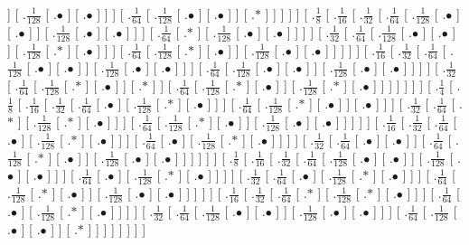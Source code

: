 \documentclass[a4paper,10pt]{article}
\begin{document}
\begin{landscape}
{]  [ .$\frac{1}{128}$  [ .$\bullet$ ]  [ .$\bullet$ ]  ]  ]  [ .$\frac{1}{64}$  [ .$\frac{1}{128}$  [ .$\bullet$ ]  [ .$\bullet$ ]  ]  [ .$*$ ]  ]  ]  ]  ]  [ .$\frac{1}{8}$  [ .$\frac{1}{16}$  [ .$\frac{1}{32}$  [ .$\frac{1}{64}$  [ .$\frac{1}{128}$  [ .$\bullet$ ]  [ .$\bullet$ ]  ]  [ .$\frac{1}{128}$  [ .$\bullet$ ]  [ .$\bullet$ ]  ]  ]  [ .$\frac{1}{64}$  [ .$*$ ]  [ .$\frac{1}{128}$  [ .$\bullet$ ]  [ .$\bullet$ ]  ]  ]  ]  [ .$\frac{1}{32}$  [ .$\frac{1}{64}$  [ .$\frac{1}{128}$  [ .$\bullet$ ]  [ .$\bullet$ ]  ]  [ .$\frac{1}{128}$  [ .$*$ ]  [ .$\bullet$ ]  ]  ]  [ .$\frac{1}{64}$  [ .$\frac{1}{128}$  [ .$*$ ]  [ .$\bullet$ ]  ]  [ .$\frac{1}{128}$  [ .$\bullet$ ]  [ .$\bullet$ ]  ]  ]  ]  ]  [ .$\frac{1}{16}$  [ .$\frac{1}{32}$  [ .$\frac{1}{64}$  [ .$\frac{1}{128}$  [ .$\bullet$ ]  [ .$\bullet$ ]  ]  [ .$\frac{1}{128}$  [ .$\bullet$ ]  [ .$\bullet$ ]  ]  ]  [ .$\frac{1}{64}$  [ .$\frac{1}{128}$  [ .$\bullet$ ]  [ .$\bullet$ ]  ]  [ .$\frac{1}{128}$  [ .$\bullet$ ]  [ .$\bullet$ ]  ]  ]  ]  [ .$\frac{1}{32}$  [ .$\frac{1}{64}$  [ .$\frac{1}{128}$  [ .$*$ ]  [ .$\bullet$ ]  ]  [ .$*$ ]  ]  [ .$\frac{1}{64}$  [ .$\frac{1}{128}$  [ .$*$ ]  [ .$\bullet$ ]  ]  [ .$\frac{1}{128}$  [ .$*$ ]  [ .$\bullet$ ]  ]  ]  ]  ]  ]  ]  [ .$\frac{1}{4}$  [ .$\frac{1}{8}$  [ .$\frac{1}{16}$  [ .$\frac{1}{32}$  [ .$\frac{1}{64}$  [ .$\bullet$ ]  [ .$\frac{1}{128}$  [ .$*$ ]  [ .$\bullet$ ]  ]  ]  [ .$\frac{1}{64}$  [ .$\frac{1}{128}$  [ .$*$ ]  [ .$\bullet$ ]  ]  [ .$\bullet$ ]  ]  ]  [ .$\frac{1}{32}$  [ .$\frac{1}{64}$  [ .$*$ ]  [ .$\frac{1}{128}$  [ .$*$ ]  [ .$\bullet$ ]  ]  ]  [ .$\frac{1}{64}$  [ .$\frac{1}{128}$  [ .$*$ ]  [ .$\bullet$ ]  ]  [ .$\frac{1}{128}$  [ .$\bullet$ ]  [ .$\bullet$ ]  ]  ]  ]  ]  [ .$\frac{1}{16}$  [ .$\frac{1}{32}$  [ .$\frac{1}{64}$  [ .$\bullet$ ]  [ .$\frac{1}{128}$  [ .$*$ ]  [ .$\bullet$ ]  ]  ]  [ .$\frac{1}{64}$  [ .$\bullet$ ]  [ .$\frac{1}{128}$  [ .$*$ ]  [ .$\bullet$ ]  ]  ]  ]  [ .$\frac{1}{32}$  [ .$\frac{1}{64}$  [ .$\bullet$ ]  [ .$\bullet$ ]  ]  [ .$\frac{1}{64}$  [ .$\frac{1}{128}$  [ .$*$ ]  [ .$\bullet$ ]  ]  [ .$\frac{1}{128}$  [ .$\bullet$ ]  [ .$\bullet$ ]  ]  ]  ]  ]  ]  [ .$\frac{1}{8}$  [ .$\frac{1}{16}$  [ .$\frac{1}{32}$  [ .$\frac{1}{64}$  [ .$\frac{1}{128}$  [ .$\bullet$ ]  [ .$\bullet$ ]  ]  [ .$\frac{1}{128}$  [ .$\bullet$ ]  [ .$\bullet$ ]  ]  ]  [ .$\frac{1}{64}$  [ .$\bullet$ ]  [ .$\frac{1}{128}$  [ .$*$ ]  [ .$\bullet$ ]  ]  ]  ]  [ .$\frac{1}{32}$  [ .$\frac{1}{64}$  [ .$\bullet$ ]  [ .$\frac{1}{128}$  [ .$*$ ]  [ .$\bullet$ ]  ]  ]  [ .$\frac{1}{64}$  [ .$\frac{1}{128}$  [ .$*$ ]  [ .$\bullet$ ]  ]  [ .$\frac{1}{128}$  [ .$\bullet$ ]  [ .$\bullet$ ]  ]  ]  ]  ]  [ .$\frac{1}{16}$  [ .$\frac{1}{32}$  [ .$\frac{1}{64}$  [ .$*$ ]  [ .$\frac{1}{128}$  [ .$*$ ]  [ .$\bullet$ ]  ]  ]  [ .$\frac{1}{64}$  [ .$\bullet$ ]  [ .$\frac{1}{128}$  [ .$*$ ]  [ .$\bullet$ ]  ]  ]  ]  [ .$\frac{1}{32}$  [ .$\frac{1}{64}$  [ .$\frac{1}{128}$  [ .$\bullet$ ]  [ .$\bullet$ ]  ]  [ .$\frac{1}{128}$  [ .$\bullet$ ]  [ .$\bullet$ ]  ]  ]  [ .$\frac{1}{64}$  [ .$\frac{1}{128}$  [ .$\bullet$ ]  [ .$\bullet$ ]  ]  [ .$*$ ]  ]  ]  ]  ]  ]  ]  ]
}

\end{landscape}
\end{document}
